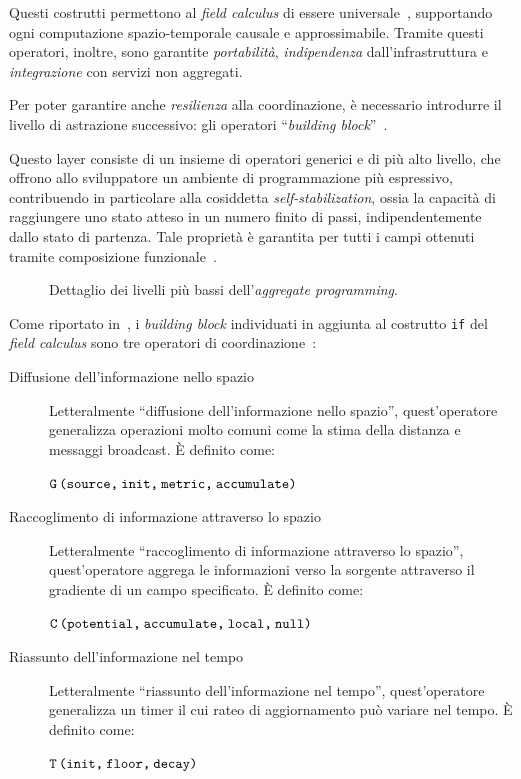 Questi costrutti permettono al \emph{field calculus} di essere universale~\cite{10.1007/978-3-319-92408-3_1},
supportando ogni computazione spazio-temporale causale e approssimabile.
Tramite questi operatori, inoltre, sono garantite \emph{portabilità}, \emph{indipendenza} dall'infrastruttura e \emph{integrazione} con servizi non aggregati.

Per poter garantire anche \emph{resilienza} alla coordinazione, è necessario introdurre il livello di astrazione successivo:
gli operatori ``\emph{building block}''~\cite{BV-FOCAS2014}.

Questo layer consiste di un insieme di operatori generici e di più alto livello, che offrono allo sviluppatore un ambiente di programmazione più espressivo,
contribuendo in particolare alla cosiddetta \emph{self-stabilization}, ossia la capacità di raggiungere uno stato atteso in un numero finito di passi,
indipendentemente dallo stato di partenza.
Tale proprietà è garantita per tutti i campi ottenuti tramite composizione funzionale~\cite{BV-FOCAS2014}.

\begin{figure}[htbp]
  \centering
  \caption{Dettaglio dei livelli più bassi dell'\emph{aggregate programming}.}%
  \label{fig:stack-detail}
\end{figure}

Come riportato in~, i \emph{building block} individuati in aggiunta al costrutto \texttt{if} del \emph{field calculus} sono tre operatori di coordinazione~\cite{7274429,BV-FOCAS2014}:

\begin{description}
  \item[Diffusione dell'informazione nello spazio]
    Letteralmente \enquote{diffusione dell'informazione nello spazio},
    quest'operatore generalizza operazioni molto comuni come la stima della distanza e messaggi broadcast.
    È definito come:

    \(\texttt{G\,(source,\:init,\:metric,\:accumulate)}\)

  \item[Raccoglimento di informazione attraverso lo spazio]
    Letteralmente \enquote{raccoglimento di informazione attraverso lo spazio},
    quest'operatore aggrega le informazioni verso la sorgente attraverso il gradiente di un campo specificato.
    È definito come:

    \(\texttt{C\,(potential,\:accumulate,\:local,\:null)}\)

  \item[Riassunto dell'informazione nel tempo]
    Letteralmente \enquote{riassunto dell'informazione nel tempo},
    quest'operatore generalizza un timer il cui rateo di aggiornamento può variare nel tempo.
    È definito come:

    \(\texttt{T\,(init,\:floor,\:decay)}\)
\end{description}


